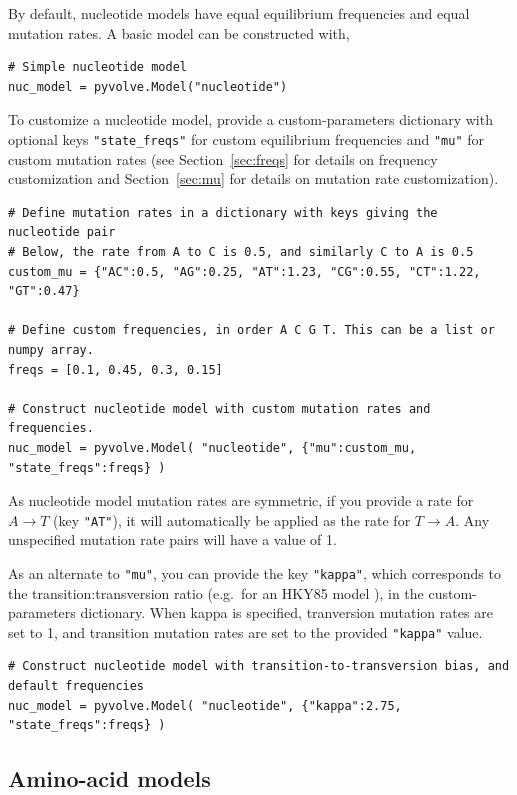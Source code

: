 \documentclass{article}
\newcommand{\code}[1]{\texttt{\small{#1}}}
\begin{document}
By default, nucleotide models have equal equilibrium frequencies and equal mutation rates. A basic model can be constructed with, 
\begin{lstlisting}
# Simple nucleotide model 
nuc_model = pyvolve.Model("nucleotide")
\end{lstlisting}

To customize a nucleotide model, provide a custom-parameters dictionary with optional keys \code{"state\_freqs"} for custom equilibrium frequencies and \code{"mu"} for custom mutation rates (see Section~\ref{sec:freqs} for details on frequency customization and Section~\ref{sec:mu} for details on mutation rate customization). 
\begin{lstlisting}
# Define mutation rates in a dictionary with keys giving the nucleotide pair
# Below, the rate from A to C is 0.5, and similarly C to A is 0.5
custom_mu = {"AC":0.5, "AG":0.25, "AT":1.23, "CG":0.55, "CT":1.22, "GT":0.47} 

# Define custom frequencies, in order A C G T. This can be a list or numpy array.
freqs = [0.1, 0.45, 0.3, 0.15]

# Construct nucleotide model with custom mutation rates and frequencies.
nuc_model = pyvolve.Model( "nucleotide", {"mu":custom_mu, "state_freqs":freqs} )
\end{lstlisting}

As nucleotide model mutation rates are symmetric, if you provide a rate for $A \rightarrow T$ (key \code{"AT"}), it will automatically be applied as the rate for $T \rightarrow A$. Any unspecified mutation rate pairs will have a value of 1.

As an alternate to \code{"mu"}, you can provide the key \code{"kappa"}, which corresponds to the transition:transversion ratio (e.g.\ for an HKY85  model \citep{HKY85}), in the custom-parameters dictionary. When kappa is specified, tranversion mutation rates are set to 1, and transition mutation rates are set to the provided \code{"kappa"} value.

\begin{lstlisting}
# Construct nucleotide model with transition-to-transversion bias, and default frequencies
nuc_model = pyvolve.Model( "nucleotide", {"kappa":2.75, "state_freqs":freqs} )
\end{lstlisting}


\subsection{Amino-acid models}\label{sec:amino_basic}
\end{document}

